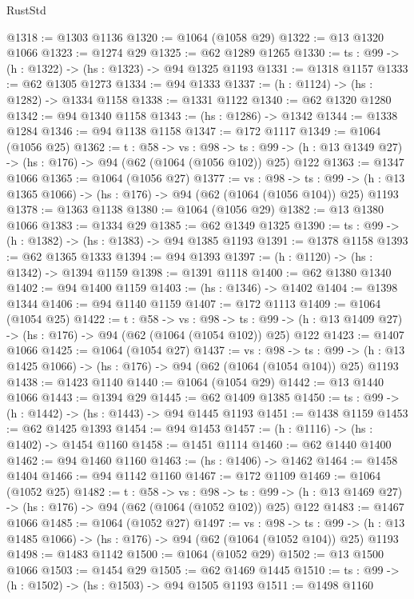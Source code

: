 \begin{lexlean}{RustStd}
\begin{coremodule}
{\begin{coremodule}
{{{{{{{{{@1318 := @1303 @1136
@1320 := @1064 (@1058 @29)
@1322 := @13 @1320 @1066
@1323 := @1274 @29
@1325 := @62 @1289 @1265
@1330 := {ts : @99} -> (h : @1322) -> (hs : @1323) -> @94 @1325 @1193
@1331 := @1318 @1157
@1333 := @62 @1305 @1273
@1334 := @94 @1333
@1337 := (h : @1124) -> (hs : @1282) -> @1334 @1158
@1338 := @1331 @1122
@1340 := @62 @1320 @1280
@1342 := @94 @1340 @1158
@1343 := (hs : @1286) -> @1342
@1344 := @1338 @1284
@1346 := @94 @1138 @1158
@1347 := @172 @1117
@1349 := @1064 (@1056 @25)
@1362 := {t : @58} ->
  {vs : @98} ->
  {ts : @99} -> (h : @13 @1349 @27) -> (hs : @176) -> @94 (@62 (@1064 (@1056 @102)) @25) @122
@1363 := @1347 @1066
@1365 := @1064 (@1056 @27)
@1377 := {vs : @98} ->
  {ts : @99} -> (h : @13 @1365 @1066) -> (hs : @176) -> @94 (@62 (@1064 (@1056 @104)) @25) @1193
@1378 := @1363 @1138
@1380 := @1064 (@1056 @29)
@1382 := @13 @1380 @1066
@1383 := @1334 @29
@1385 := @62 @1349 @1325
@1390 := {ts : @99} -> (h : @1382) -> (hs : @1383) -> @94 @1385 @1193
@1391 := @1378 @1158
@1393 := @62 @1365 @1333
@1394 := @94 @1393
@1397 := (h : @1120) -> (hs : @1342) -> @1394 @1159
@1398 := @1391 @1118
@1400 := @62 @1380 @1340
@1402 := @94 @1400 @1159
@1403 := (hs : @1346) -> @1402
@1404 := @1398 @1344
@1406 := @94 @1140 @1159
@1407 := @172 @1113
@1409 := @1064 (@1054 @25)
@1422 := {t : @58} ->
  {vs : @98} ->
  {ts : @99} -> (h : @13 @1409 @27) -> (hs : @176) -> @94 (@62 (@1064 (@1054 @102)) @25) @122
@1423 := @1407 @1066
@1425 := @1064 (@1054 @27)
@1437 := {vs : @98} ->
  {ts : @99} -> (h : @13 @1425 @1066) -> (hs : @176) -> @94 (@62 (@1064 (@1054 @104)) @25) @1193
@1438 := @1423 @1140
@1440 := @1064 (@1054 @29)
@1442 := @13 @1440 @1066
@1443 := @1394 @29
@1445 := @62 @1409 @1385
@1450 := {ts : @99} -> (h : @1442) -> (hs : @1443) -> @94 @1445 @1193
@1451 := @1438 @1159
@1453 := @62 @1425 @1393
@1454 := @94 @1453
@1457 := (h : @1116) -> (hs : @1402) -> @1454 @1160
@1458 := @1451 @1114
@1460 := @62 @1440 @1400
@1462 := @94 @1460 @1160
@1463 := (hs : @1406) -> @1462
@1464 := @1458 @1404
@1466 := @94 @1142 @1160
@1467 := @172 @1109
@1469 := @1064 (@1052 @25)
@1482 := {t : @58} ->
  {vs : @98} ->
  {ts : @99} -> (h : @13 @1469 @27) -> (hs : @176) -> @94 (@62 (@1064 (@1052 @102)) @25) @122
@1483 := @1467 @1066
@1485 := @1064 (@1052 @27)
@1497 := {vs : @98} ->
  {ts : @99} -> (h : @13 @1485 @1066) -> (hs : @176) -> @94 (@62 (@1064 (@1052 @104)) @25) @1193
@1498 := @1483 @1142
@1500 := @1064 (@1052 @29)
@1502 := @13 @1500 @1066
@1503 := @1454 @29
@1505 := @62 @1469 @1445
@1510 := {ts : @99} -> (h : @1502) -> (hs : @1503) -> @94 @1505 @1193
@1511 := @1498 @1160
}}}}}}}}}
\end{coremodule}}
\end{coremodule}
\end{lexlean}
